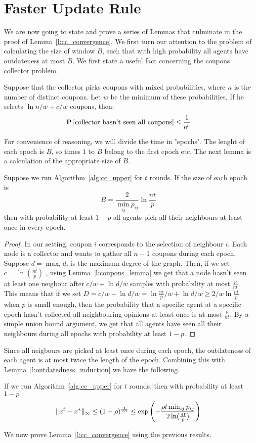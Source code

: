 \section{Faster Update Rule}\label{app:s:cc_convergence}
We are now going to state and prove a series of Lemmas that culminate in 
the proof of Lemma~\ref{l:cc_convergence}. We first turn our attention to
the problem of calculating the size of window $B$, such that with high probability
all agents have outdateness at most $B$. 
We first state a useful fact concerning the coupons collector problem.

\begin{lemma}\label{l:coupons_lemma}
Suppose that the collector picks coupons with mixed 
probabilities, where $n$ is the number of distinct coupons.
Let $w$ be the minimum of these probabilities. 
If he selects $\ln n/w+ c/w$ coupons, then:
$$
\bm{\mathrm{P}}\left[\text{collector hasn't seen all coupons}\right] \leq \frac{1}{\mathrm{e}^c}
$$
\end{lemma}

For convenience of reasoning, we will divide the time in "epochs". 
The lenght of each epoch is $B$, so times $1$ to $B$ belong to the first 
epoch etc. 
The next lemma is a calculation of the appropriate size of $B$.
\begin{lemma}
Suppose we run Algorithm~\ref{alg:cc_upper} for $t$ rounds. If the size of
each epoch is 
\[
B = \frac{2}{\min_{ij}p_{ij}}\ln \frac{nt}{p}
\]
then with probability at least $1-p$ all agents pich all their neighbours 
at least once in every epoch. 
\end{lemma}
\begin{proof}
In our setting, coupon $i$ corresponds to the selection of neighbour $i$. Each node is a 
collector and wants to gather all $n-1$ coupons during each epoch. 
Suppose $d = \max_i d_i$ is the maximum degree of the graph. 
Then, if we set  $c = \ln (\frac{nt}{p})$ , using Lemma~\ref{l:coupons_lemma} 
we get that a node hasn't seen at least one neigbour after $c/w + \ln d/w$ samples 
with probability at most $\frac{p}{nt}$. This means that if we set 
$D = c/w + \ln d/w =  \ln \frac{nt}{p}/w +  \ln d/w \geq 2/w\ln\frac{nt}{p} $ when $p$ is 
small enough, then the probability that a specific agent at a specific epoch hasn't collected 
all neighbouring opinions at least once is at most $\frac{p}{nt}$. By a simple union bound argument, 
we get that all agents have seen all their neighbours during all epochs
 with probability at least $1 - p$.
\end{proof}
Since all neigbours are picked at least once during each epoch,
the outdateness of each agent is at most twice the length of the 
epoch. Combining this with Lemma~\ref{l:outdatedness_induction} we have 
the following.
\begin{corollary}\label{cor:window}
If we run Algorithm~\ref{alg:cc_upper} for $t$ rounds, then with probability at least 
$1-p$
$$ \| x^{t}-x^* \|_{\infty} \leq (1-\rho)^{\frac{t}{2B}} 
\leq \exp \left(-\frac{\rho t\min_{ij}p_{ij}}{2\ln( \frac{nt}{p})} \right)$$
\end{corollary}
We now prove Lemma~\ref{l:cc_convergence} using the previous results.


